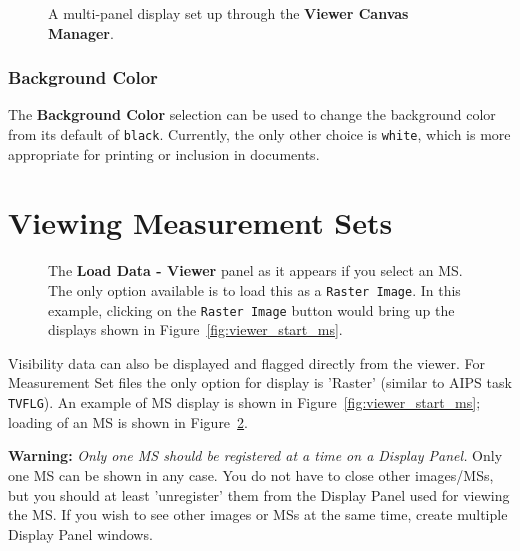 \begin{figure}[h!]
\begin{center}
\caption{\label{fig:viewer_canvas} A multi-panel display
set up through the {\bf Viewer Canvas Manager}.} 
\hrulefill
\end{center}
\end{figure}

\subsubsection{Background Color}
\label{section:display.viewerGUI.canvas.background}

The {\bf Background Color} selection can be used to change the
background color from its default of {\tt black}.  Currently,
the only other choice is {\tt white}, which is more appropriate
for printing or inclusion in documents.

\section{Viewing Measurement Sets}
\label{section:display.ms}

\begin{figure}[h!]
\begin{center}
\caption{\label{fig:viewer_load_ms} The {\bf Load Data - Viewer} panel
as it appears if you select an MS.  The only option available is
to load this as a {\tt Raster Image}.  In this example, clicking
on the {\tt Raster Image} button would bring up the displays shown
in Figure~\ref{fig:viewer_start_ms}.}
\hrulefill
\end{center}
\end{figure}

Visibility data can also be displayed and flagged directly from the
viewer. For Measurement Set files the only option for display is 'Raster'
(similar to AIPS task {\tt TVFLG}).  An example of MS display is
shown in Figure~\ref{fig:viewer_start_ms}; loading of an
MS is shown in Figure~\ref{fig:viewer_load_ms}.  

{\bf Warning:} {\em Only one MS should be registered at a time on a
Display Panel.} 
Only one MS can be shown in any case.  
You do not have to close other images/MSs, but you should at
least 'unregister' them from the Display Panel used for viewing the MS.
If you wish to see other images or MSs at the same time, create multiple
Display Panel windows.


